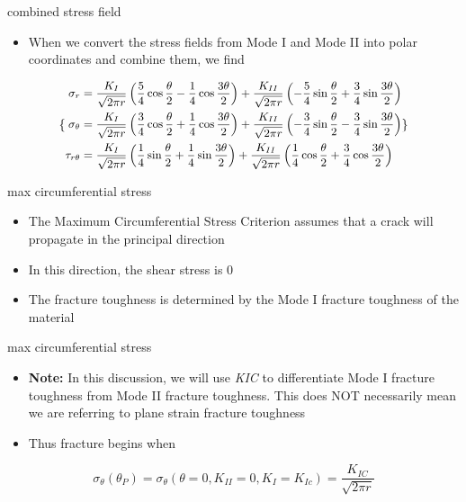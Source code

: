 \documentclass[
  letterpaper,
  ignorenonframetext,
  aspectratio=43,
  handout,
  12pt]{beamer}
\providecommand{\tightlist}{%
  \setlength{\itemsep}{0pt}\setlength{\parskip}{0pt}}
\providecommand{\tightlist}{%
\setlength{\itemsep}{0pt}\setlength{\parskip}{0pt}}
\begin{document}
\begin{frame}{combined stress field}
\protect\hypertarget{combined-stress-field}{}
\begin{itemize}
\tightlist
\item
  When we convert the stress fields from Mode I and Mode II into polar
  coordinates and combine them, we find
\end{itemize}

\[\small\{\begin{aligned}
  \sigma_r &= \frac{K_I}{\sqrt{2\pi r}} \left(\frac{5}{4}\cos \frac{\theta}{2} - \frac{1}{4}\cos \frac{3\theta}{2}\right) + \frac{K_{II}}{\sqrt{2\pi r}}\left(-\frac{5}{4}\sin \frac{\theta}{2} + \frac{3}{4}\sin \frac{3\theta}{2}\right)\\
  \sigma_\theta &= \frac{K_I}{\sqrt{2\pi r}} \left(\frac{3}{4}\cos \frac{\theta}{2} + \frac{1}{4}\cos \frac{3\theta}{2}\right) + \frac{K_{II}}{\sqrt{2\pi r}}\left(-\frac{3}{4}\sin \frac{\theta}{2} - \frac{3}{4}\sin \frac{3\theta}{2}\right)\\
  \tau_{r\theta} &= \frac{K_I}{\sqrt{2\pi r}} \left(\frac{1}{4}\sin \frac{\theta}{2} + \frac{1}{4}\sin \frac{3\theta}{2}\right) + \frac{K_{II}}{\sqrt{2\pi r}}\left(\frac{1}{4}\cos \frac{\theta}{2} + \frac{3}{4}\cos \frac{3\theta}{2}\right)
\end{aligned} \}\]
\end{frame}

\begin{frame}{max circumferential stress}
\protect\hypertarget{max-circumferential-stress}{}
\begin{itemize}
\tightlist
\item
  The Maximum Circumferential Stress Criterion assumes that a crack will
  propagate in the principal direction
\item
  In this direction, the shear stress is 0
\item
  The fracture toughness is determined by the Mode I fracture toughness
  of the material
\end{itemize}
\end{frame}

\begin{frame}{max circumferential stress}
\protect\hypertarget{max-circumferential-stress-1}{}
\begin{itemize}
\tightlist
\item
  \textbf{Note:} In this discussion, we will use \emph{K}\emph{IC} to
  differentiate Mode I fracture toughness from Mode II fracture
  toughness. This does NOT necessarily mean we are referring to plane
  strain fracture toughness
\item
  Thus fracture begins when
\end{itemize}

\[\sigma_{\theta}(\theta_P) = \sigma_\theta(\theta=0, K_{II}=0, K_I = K_{Ic}) = \frac{K_{IC}}{\sqrt{2\pi r}}\]
\end{frame}
\end{document}
